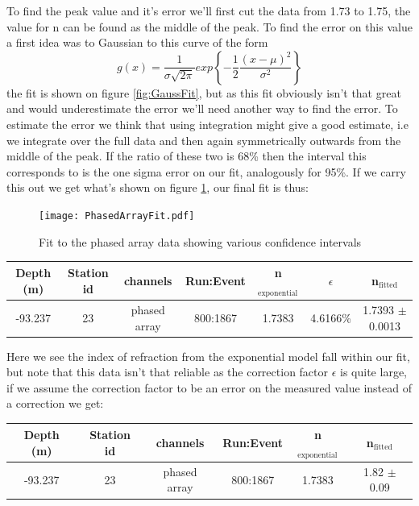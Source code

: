 To find the peak value and it's error we'll first cut the data from
1.73 to 1.75, the value for n can be found as the middle of the
peak. To find the error on this value a first idea was to Gaussian
to this curve of the
form\cite{grabe2005measurement}
\begin{equation}
	g(x) = \frac{1}{\sigma \sqrt{2\pi}} exp\left\{-\frac{1}{2}\frac{(x-\mu)^2}{\sigma^2}\right\}
\end{equation}
the fit is shown on figure \ref{fig:GaussFit}, but as this fit obviously isn't
that great and would underestimate the error we'll need another way to find the
error.  To estimate the error we think that using integration might give a good
estimate, i.e we integrate over the full data and then again symmetrically
outwards from the middle of the peak. If the ratio of these two is 68\% then
the interval this corresponds to is the one sigma error on our fit, analogously
for 95\%. If we carry this out we get what's shown on figure
\ref{fig:PhasedArrayFit}, our final fit is thus:
\begin{figure}
	\centering
	\texttt{[image: PhasedArrayFit.pdf]}
	\caption{Fit to the phased array data showing various confidence intervals}
	\label{fig:PhasedArrayFit}
\end{figure}
\begin{center}
\begin{tabular}{||c c c c c c c||}
 \hline
 Depth (m) & Station id & channels & Run:Event & n$_\text{exponential}$ & $\epsilon$ & n$_\text{fitted}$\\ [0.5ex]
 \hline\hline
 -93.237 & 23 & phased array & 800:1867 & 1.7383 & 4.6166\% & 1.7393 $\pm$ 0.0013 \\
 \hline
\end{tabular}
\end{center}
Here we see the index of refraction from the exponential model fall within our
fit, but note that this data isn't that reliable as the correction factor
$\epsilon$ is quite large, if we assume the correction factor to be an error on
the measured value instead of a correction we get:
\begin{center}
\begin{tabular}{||c c c c c c||}
 \hline
 Depth (m) & Station id & channels & Run:Event & n$_\text{exponential}$ & n$_\text{fitted}$\\ [0.5ex]
 \hline\hline
 -93.237 & 23 & phased array & 800:1867 & 1.7383 & 1.82 $\pm$ 0.09 \\
 \hline
\end{tabular}
\end{center}
